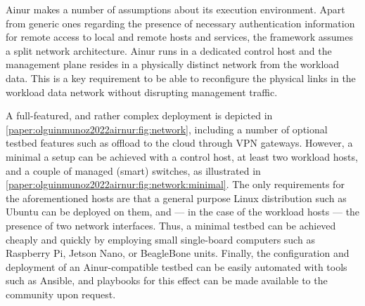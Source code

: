 Ainur makes a number of assumptions about its execution environment.
Apart from generic ones regarding the presence of necessary authentication information for remote access to local and remote hosts and services, the framework assumes a split network architecture.
Ainur runs in a dedicated control host and the management plane resides in a physically distinct network from the workload data.
This is a key requirement to be able to reconfigure the physical links in the workload data network without disrupting management traffic.

A full-featured, and rather complex deployment is depicted in \cref{paper:olguinmunoz2022airnur:fig:network}, including a number of optional testbed features such as offload to the cloud through \gls{VPN} gateways.
However, a minimal a setup can be achieved with a control host, at least two workload hosts, and a couple of managed (smart) switches, as illustrated in \cref{paper:olguinmunoz2022airnur:fig:network:minimal}.
The only requirements for the aforementioned hosts are that a general purpose Linux distribution such as Ubuntu can be deployed on them, and --- in the case of the workload hosts --- the presence of two network interfaces.
Thus, a minimal testbed can be achieved cheaply and quickly by employing small single-board computers such as Raspberry Pi, Jetson Nano, or BeagleBone units.
Finally, the configuration and deployment of an Ainur-compatible testbed can be easily automated with tools such as Ansible, and playbooks for this effect can be made available to the community upon request.

